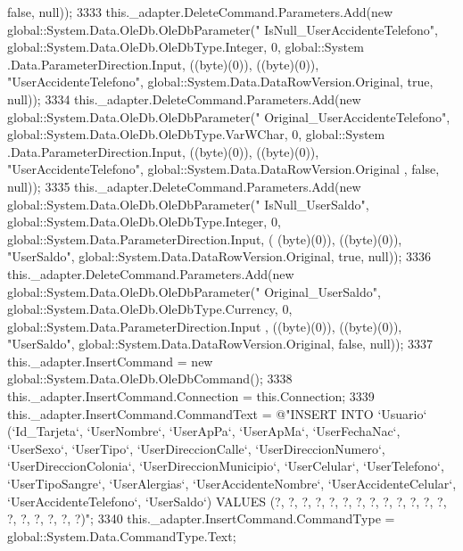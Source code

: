 \begin{DoxyCode}
{      false}, null));
3333             this.\_adapter.DeleteCommand.Parameters.Add(\textcolor{keyword}{new} global::System.Data.OleDb.OleDbParameter(\textcolor{stringliteral}{"
      IsNull\_UserAccidenteTelefono"}, global::System.Data.OleDb.OleDbType.Integer, 0, global::System
      .Data.ParameterDirection.Input, ((byte)(0)), ((byte)(0)), \textcolor{stringliteral}{"UserAccidenteTelefono"}, global::System.Data.DataRowVersion.Original, \textcolor{keyword}{
      true}, null));
3334             this.\_adapter.DeleteCommand.Parameters.Add(\textcolor{keyword}{new} global::System.Data.OleDb.OleDbParameter(\textcolor{stringliteral}{"
      Original\_UserAccidenteTelefono"}, global::System.Data.OleDb.OleDbType.VarWChar, 0, global::System
      .Data.ParameterDirection.Input, ((byte)(0)), ((byte)(0)), \textcolor{stringliteral}{"UserAccidenteTelefono"}, global::System.Data.DataRowVersion.Original
      , \textcolor{keyword}{false}, null));
3335             this.\_adapter.DeleteCommand.Parameters.Add(\textcolor{keyword}{new} global::System.Data.OleDb.OleDbParameter(\textcolor{stringliteral}{"
      IsNull\_UserSaldo"}, global::System.Data.OleDb.OleDbType.Integer, 0, global::System.Data.ParameterDirection.Input, (
      (byte)(0)), ((byte)(0)), \textcolor{stringliteral}{"UserSaldo"}, global::System.Data.DataRowVersion.Original, \textcolor{keyword}{true}, null));
3336             this.\_adapter.DeleteCommand.Parameters.Add(\textcolor{keyword}{new} global::System.Data.OleDb.OleDbParameter(\textcolor{stringliteral}{"
      Original\_UserSaldo"}, global::System.Data.OleDb.OleDbType.Currency, 0, global::System.Data.ParameterDirection.Input
      , ((byte)(0)), ((byte)(0)), \textcolor{stringliteral}{"UserSaldo"}, global::System.Data.DataRowVersion.Original, \textcolor{keyword}{false}, null));
3337             this.\_adapter.InsertCommand = \textcolor{keyword}{new} global::System.Data.OleDb.OleDbCommand();
3338             this.\_adapter.InsertCommand.Connection = this.Connection;
3339             this.\_adapter.InsertCommand.CommandText = \textcolor{stringliteral}{@"INSERT INTO `Usuario` (`Id\_Tarjeta`, `UserNombre`,
       `UserApPa`, `UserApMa`, `UserFechaNac`, `UserSexo`, `UserTipo`, `UserDireccionCalle`, `UserDireccionNumero`,
       `UserDireccionColonia`, `UserDireccionMunicipio`, `UserCelular`, `UserTelefono`, `UserTipoSangre`,
       `UserAlergias`, `UserAccidenteNombre`, `UserAccidenteCelular`, `UserAccidenteTelefono`, `UserSaldo`) VALUES (?, ?,
       ?, ?, ?, ?, ?, ?, ?, ?, ?, ?, ?, ?, ?, ?, ?, ?, ?)"};
3340             this.\_adapter.InsertCommand.CommandType = global::System.Data.CommandType.Text;

\end{DoxyCode}

